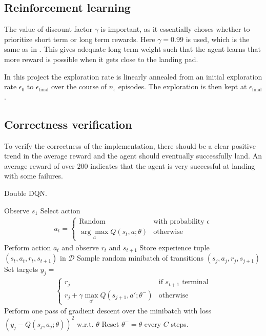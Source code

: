 \documentclass{article}
\begin{document}
\subsection{Reinforcement learning}

The value of discount factor $\gamma$ is important, as it essentially choses whether to prioritize short term or long term rewards. Here $\gamma = 0.99$ is used, which is the same as in \cite{mnih2015humanlevel}. This gives adequate long term weight such that the agent learns that more reward is possible when it gets close to the landing pad.

In this project the exploration rate is linearly annealed from an initial exploration rate $\epsilon_0$ to $\epsilon_\text{final}$ over the course of $n_\epsilon$ episodes. The exploration is then kept at $\epsilon_\text{final}$.

\subsection{Correctness verification}
To verify the correctness of the implementation, there should be a clear positive trend in the average reward and the agent should eventually successfully land. An average reward of over $200$ indicates that the agent is very successful at landing with some failures.

\begin{algorithm}[tb]
   \caption{Double DQN.}
   \label{alg:ddqn}
\begin{algorithmic}[1]
    \STATE Observe $s_1$
      \STATE Select action
      \begin{align*}
        a_t = \begin{cases}
          \text{Random} & \text{with probability } \epsilon \\
          \underset{a}{\arg \max} Q(s_t, a; \theta) & \text{otherwise}
        \end{cases}
      \end{align*}
      \STATE Perform action $a_t$ and observe $r_t$ and $s_{t+1}$
      \STATE Store experience tuple $(s_{t}, a_{t}, r_{t}, s_{t+1})$ in $\mathcal{D}$
      \STATE Sample random minibatch of transitions $(s_j, a_j, r_j, s_{j+1})$
      \STATE Set targets $y_j = $
      \begin{align*}
        \begin{cases}
          r_j & \text{if } s_{t+1} \text{ terminal} \\
          r_j + \gamma \max_{a'} Q(s_{j+1}, a'; \theta^{-}) & \text{otherwise}
        \end{cases}
      \end{align*}
      \STATE Perform one pass of gradient descent over the minibatch with loss $(y_j - Q(s_j, a_j; \theta))^2$ w.r.t. $\theta$
      \STATE Reset $\theta^{-} = \theta$ every $C$ steps.
    \ENDFOR
  \ENDFOR
\end{algorithmic}
\end{algorithm}
\end{document}
